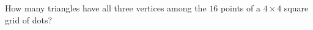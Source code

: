 How many triangles have all three vertices among the $16$ points of a $4\times4$ square grid of dots?
